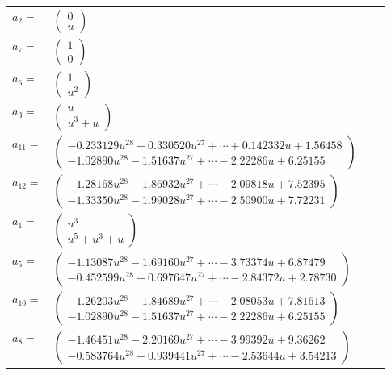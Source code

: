 \documentclass[1p]{elsarticle_modified}
\theoremstyle{definition}
\begin{document}
\begin{tabular}{m{7pt} m{180pt} m{7pt} m{180pt} }
\flushright $a_{2}=$&$\begin{pmatrix}0\\u\end{pmatrix}$ \\
\flushright $a_{7}=$&$\begin{pmatrix}1\\0\end{pmatrix}$ \\
\flushright $a_{6}=$&$\begin{pmatrix}1\\u^2\end{pmatrix}$ \\
\flushright $a_{3}=$&$\begin{pmatrix}u\\u^3+u\end{pmatrix}$ \\
\flushright $a_{11}=$&$\begin{pmatrix}-0.233129 u^{28}-0.330520 u^{27}+\cdots+0.142332 u+1.56458\\-1.02890 u^{28}-1.51637 u^{27}+\cdots-2.22286 u+6.25155\end{pmatrix}$ \\
\flushright $a_{12}=$&$\begin{pmatrix}-1.28168 u^{28}-1.86932 u^{27}+\cdots-2.09818 u+7.52395\\-1.33350 u^{28}-1.99028 u^{27}+\cdots-2.50900 u+7.72231\end{pmatrix}$ \\
\flushright $a_{1}=$&$\begin{pmatrix}u^3\\u^5+u^3+u\end{pmatrix}$ \\
\flushright $a_{5}=$&$\begin{pmatrix}-1.13087 u^{28}-1.69160 u^{27}+\cdots-3.73374 u+6.87479\\-0.452599 u^{28}-0.697647 u^{27}+\cdots-2.84372 u+2.78730\end{pmatrix}$ \\
\flushright $a_{10}=$&$\begin{pmatrix}-1.26203 u^{28}-1.84689 u^{27}+\cdots-2.08053 u+7.81613\\-1.02890 u^{28}-1.51637 u^{27}+\cdots-2.22286 u+6.25155\end{pmatrix}$ \\
\flushright $a_{8}=$&$\begin{pmatrix}-1.46451 u^{28}-2.20169 u^{27}+\cdots-3.99392 u+9.36262\\-0.583764 u^{28}-0.939441 u^{27}+\cdots-2.53644 u+3.54213\end{pmatrix}$ \\

\end{tabular}
\end{document}
